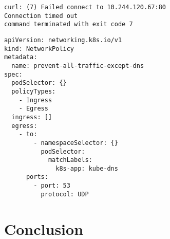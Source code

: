 \documentclass[titlepage]{report}
\begin{document}
\begin{minipage}{\linewidth}
\begin{lstlisting}[caption={Snippet of the command \emph{minikube kubectl exec deploy/client -- -- curl -I --silent 10.244.120.67} with network policies enabled},label={lst:curlfailure}]
curl: (7) Failed connect to 10.244.120.67:80
Connection timed out
command terminated with exit code 7
\end{lstlisting}
\end{minipage}
\begin{minipage}{\linewidth}
\begin{lstlisting}[caption={Kubernetes network policy that only allows DNS traffic},label={lst:netpol}]
apiVersion: networking.k8s.io/v1
kind: NetworkPolicy
metadata:
  name: prevent-all-traffic-except-dns
spec:
  podSelector: {}
  policyTypes:
    - Ingress
    - Egress
  ingress: []
  egress:
    - to:
        - namespaceSelector: {}
          podSelector:
            matchLabels:
              k8s-app: kube-dns
      ports:
        - port: 53
          protocol: UDP
\end{lstlisting}
\end{minipage}

\chapter{Conclusion}
\end{document}
